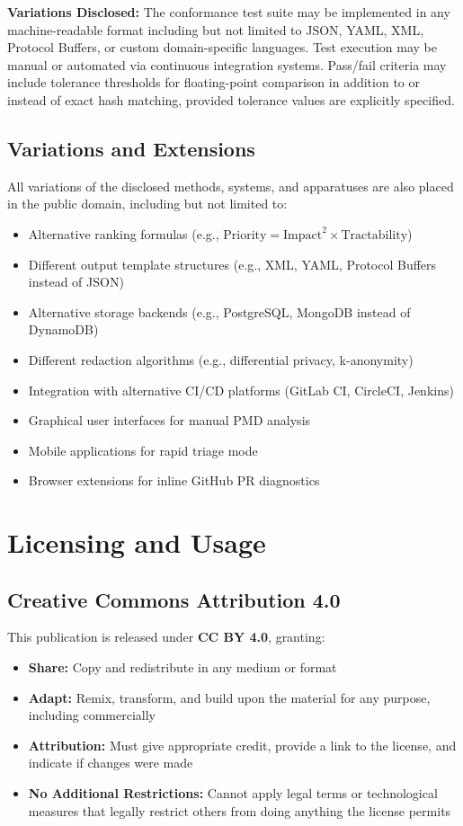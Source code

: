\documentclass[11pt,a4paper]{article}
\begin{document}
\textbf{Variations Disclosed:} The conformance test suite may be 
implemented in any machine-readable format including but not limited 
to JSON, YAML, XML, Protocol Buffers, or custom domain-specific 
languages. Test execution may be manual or automated via continuous 
integration systems. Pass/fail criteria may include tolerance thresholds 
for floating-point comparison in addition to or instead of exact hash 
matching, provided tolerance values are explicitly specified.
\subsection{Variations and Extensions}

All variations of the disclosed methods, systems, and apparatuses are also placed in the public domain, including but not limited to:

\begin{itemize}
\item Alternative ranking formulas (e.g., $\text{Priority} = \text{Impact}^2 \times \text{Tractability}$)
\item Different output template structures (e.g., XML, YAML, Protocol Buffers instead of JSON)
\item Alternative storage backends (e.g., PostgreSQL, MongoDB instead of DynamoDB)
\item Different redaction algorithms (e.g., differential privacy, k-anonymity)
\item Integration with alternative CI/CD platforms (GitLab CI, CircleCI, Jenkins)
\item Graphical user interfaces for manual PMD analysis
\item Mobile applications for rapid triage mode
\item Browser extensions for inline GitHub PR diagnostics
\end{itemize}

\section{Licensing and Usage}

\subsection{Creative Commons Attribution 4.0}

This publication is released under \textbf{CC BY 4.0}, granting:

\begin{itemize}
\item \textbf{Share:} Copy and redistribute in any medium or format
\item \textbf{Adapt:} Remix, transform, and build upon the material for any purpose, including commercially
\item \textbf{Attribution:} Must give appropriate credit, provide a link to the license, and indicate if changes were made
\item \textbf{No Additional Restrictions:} Cannot apply legal terms or technological measures that legally restrict others from doing anything the license permits
\end{itemize}
\end{document}
